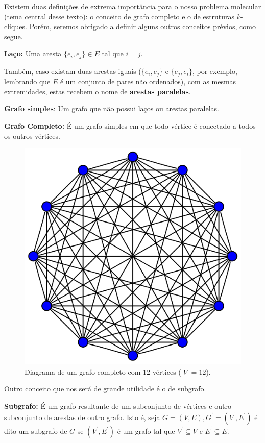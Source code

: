 \documentclass[a4paper,12pt]{article}
\begin{document}
Existem duas definições de extrema importância para o nosso problema molecular (tema central desse texto): o conceito de grafo completo e o de estruturas $k$-cliques. Porém, seremos obrigado a definir alguns outros conceitos prévios, como segue. 


\begin{center}
	\begin{minipage}{0.9 \linewidth}
		\textbf{Laço:} Uma aresta $\{e_i, e_j\} \in E$ tal que $i = j$.
	\end{minipage}
\end{center}

Também, caso existam duas arestas iguais ($\{e_i, e_j\}$ e 
$\{e_j, e_i\}$, por exemplo, lembrando que $E$ é um conjunto de pares não ordenados), com as mesmas extremidades, estas recebem o nome de \textbf{arestas paralelas}.

\begin{center}
	\begin{minipage}{0.9 \linewidth}
		\textbf{Grafo simples}: Um grafo que não possui laços ou arestas paralelas.
	\end{minipage}
\end{center}

\begin{center}
	\begin{minipage}{0.9 \linewidth}
		\textbf{Grafo Completo:} É um grafo simples em que todo vértice é conectado a todos os outros vértices.
	\end{minipage}
\end{center}

\begin{figure}[H]
	\begin{center}
		\includegraphics[width=0.4\linewidth]{grafocompleto.png}
	\end{center}
	\caption{Diagrama de um grafo completo com 12 vértices ($|V| = 12$).}
	\label{fig:grafocompleto}
\end{figure}

Outro conceito que nos será de grande utilidade é o de subgrafo.
\begin{center}
	\begin{minipage}{0.9 \linewidth}
		\textbf{Subgrafo:} É um grafo resultante de um subconjunto de vértices e outro subconjunto de arestas de outro grafo. Isto é, seja $G = (V, E), G^\prime = (V^\prime, E^\prime)$ é dito um subgrafo de $G$ se $(V^\prime, E^\prime)$ é um grafo tal que $V^\prime \subseteq V$ e $E^\prime \subseteq E$.
	\end{minipage}
\end{center}
\end{document}
